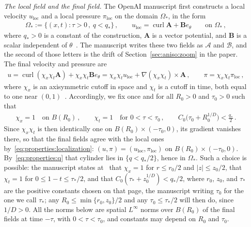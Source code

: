 \documentclass[11pt,reqno]{amsproc}
\numberwithin{equation}{section}
\theoremstyle{remark}
\newcommand{\curl}{\operatorname{curl}}
\begin{document}
\smallskip
\noindent\emph{The local field and the final field.} The OpenAI manuscript first constructs a local velocity $u_{\mathrm{loc}}$ and a local pressure $\pi_{\mathrm{loc}}$ on the domain $\Omega_*$, in the form
\begin{align}
\Omega_*:=\{(x,t)\colon\tau>0\,,\ q<q_*\}
\,,\qquad
u_{\mathrm{loc}}=\curl\mathbf A+\mathbf Be_\theta
\qquad\mbox{on }\Omega_*
\,,
\label{eq:properties:local}
\end{align}
where $q_*>0$ is a constant of the construction, $\mathbf A$ is a vector potential, and $\mathbf B$ is a scalar independent of $\theta$~\cite[Theorem~3.1 and its part~(i) with equation~(3.3), p.~15, and equation~(9.21), p.~115]{OpenAIManuscript}. The manuscript writes these two fields as $\mathcal A$ and $\mathcal B$, and the second of those letters is the drift of Section~\ref{sec:aniso:zoom} in the paper. The final velocity and pressure are
\begin{align}
u=\curl(\chi_x\chi_t\mathbf A)+\chi_x\chi_t\mathbf Be_\theta
=\chi_x\chi_tu_{\mathrm{loc}}+\nabla(\chi_x\chi_t)\times\mathbf A
\,,\qquad
\pi=\chi_x\chi_t\pi_{\mathrm{loc}}
\,,
\label{eq:properties:localization}
\end{align}
where $\chi_x$ is an axisymmetric cutoff in space and $\chi_t$ is a cutoff in time, both equal to one near $(0,1)$~\cite[equation~(10.4) and the display below it, p.~118, and Section~3.5, p.~16]{OpenAIManuscript}. Accordingly, we fix once and for all $R_0>0$ and $\tau_0>0$ such that
\begin{align}
\chi_x=1\quad\mbox{on }B(R_0)
\,,\qquad
\chi_t=1\quad\mbox{for }0<\tau<\tau_0
\,,\qquad
C_0\bigl(\tau_0+R_0^{1/D}\bigr)<\frac{q_*}{2}
\,.
\label{eq:properties:cylinder}
\end{align}
Since $\chi_x\chi_t$ is then identically one on $B(R_0)\times(-\tau_0,0)$, its gradient vanishes there, so that the final fields agree with the local ones by~\eqref{eq:properties:localization}: $(u,\pi)=(u_{\mathrm{loc}},\pi_{\mathrm{loc}})$ on $B(R_0)\times(-\tau_0,0)$. By~\eqref{eq:properties:q} that cylinder lies in $\{q<q_*/2\}$, hence in $\Omega_*$. Such a choice is possible: the manuscript states at~\cite[p.~118]{OpenAIManuscript} that $\chi_x=1$ for $r\le r_0/2$ and $|z|\le z_0/2$, that $\chi_t=1$ for $0\le1-t\le\tau_*/2$, and that $C_0(\tau_*+z_0^{1/D})<q_*/2$, where $r_0$, $z_0$, and $\tau_*$ are the positive constants chosen on that page, the manuscript writing $\tau_0$ for the one we call $\tau_*$; any $R_0\le\min\{r_0,z_0\}/2$ and any $\tau_0\le\tau_*/2$ will then do, since $1/D>0$. All the norms below are spatial $L^\infty$ norms over $B(R_0)$ of the final fields at time $-\tau$, with $0<\tau<\tau_0$, and constants may depend on $R_0$ and $\tau_0$.
\end{document}
